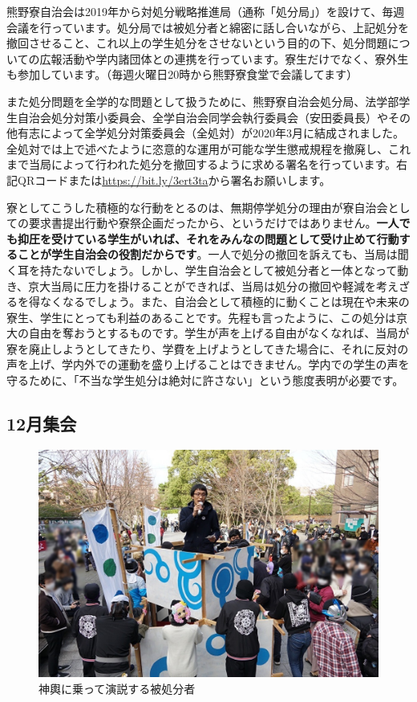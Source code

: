 熊野寮自治会は2019年から対処分戦略推進局（通称「処分局」）を設けて、毎週会議を行っています。処分局では被処分者と綿密に話し合いながら、上記処分を撤回させること、これ以上の学生処分をさせないという目的の下、処分問題についての広報活動や学内諸団体との連携を行っています。寮生だけでなく、寮外生も参加しています。（毎週火曜日20時から熊野寮食堂で会議してます）

また処分問題を全学的な問題として扱うために、熊野寮自治会処分局、法学部学生自治会処分対策小委員会、全学自治会同学会執行委員会（安田委員長）やその他有志によって全学処分対策委員会（全処対）が2020年3月に結成されました。全処対では上で述べたように恣意的な運用が可能な学生懲戒規程を撤廃し、これまで当局によって行われた処分を撤回するように求める署名を行っています。右記QRコードまたは\url{https://bit.ly/3ert3ta}から署名お願いします。

寮としてこうした積極的な行動をとるのは、無期停学処分の理由が寮自治会としての要求書提出行動や寮祭企画だったから、というだけではありません。\textbf{一人でも抑圧を受けている学生がいれば、それをみんなの問題として受け止めて行動することが学生自治会の役割だからです}。一人で処分の撤回を訴えても、当局は聞く耳を持たないでしょう。しかし、学生自治会として被処分者と一体となって動き、京大当局に圧力を掛けることができれば、当局は処分の撤回や軽減を考えざるを得なくなるでしょう。また、自治会として積極的に動くことは現在や未来の寮生、学生にとっても利益のあることです。先程も言ったように、この処分は京大の自由を奪おうとするものです。学生が声を上げる自由がなくなれば、当局が寮を廃止しようとしてきたり、学費を上げようとしてきた場合に、それに反対の声を上げ、学内外での運動を盛り上げることはできません。学内での学生の声を守るために、「不当な学生処分は絶対に許さない」という態度表明が必要です。


\subsection{12月集会}

\begin{figure}
    \vspace*{-\intextsep}
    \includegraphics[width=18zw]{gazo/202112shukai.jpg}
    \captionsetup{labelformat=empty,labelsep=none}
    \caption{神輿に乗って演説する被処分者}
\end{figure}

